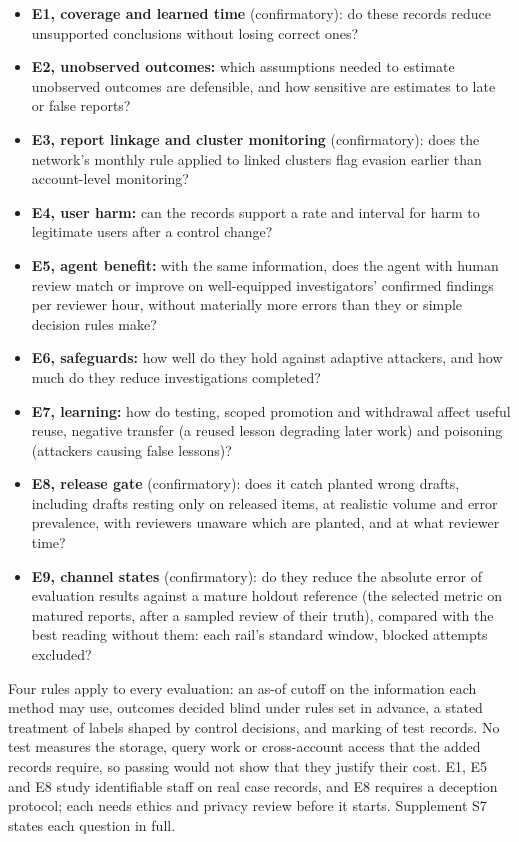 \documentclass[acmlarge,nonacm]{acmart}
\providecommand{\tightlist}{\setlength{\itemsep}{0pt}\setlength{\parskip}{0pt}}
\begin{document}
\begin{itemize}
\tightlist
\item
  \textbf{E1, coverage and learned time} (confirmatory): do these
  records reduce unsupported conclusions without losing correct ones?
\item
  \textbf{E2, unobserved outcomes:} which assumptions needed to estimate
  unobserved outcomes are defensible, and how sensitive are estimates to
  late or false reports?
\item
  \textbf{E3, report linkage and cluster monitoring} (confirmatory):
  does the network's monthly rule applied to linked clusters flag
  evasion earlier than account-level monitoring?
\item
  \textbf{E4, user harm:} can the records support a rate and interval
  for harm to legitimate users after a control change?
\item
  \textbf{E5, agent benefit:} with the same information, does the agent
  with human review match or improve on well-equipped investigators'
  confirmed findings per reviewer hour, without materially more errors
  than they or simple decision rules make?
\item
  \textbf{E6, safeguards:} how well do they hold against adaptive
  attackers, and how much do they reduce investigations completed?
\item
  \textbf{E7, learning:} how do testing, scoped promotion and withdrawal
  affect useful reuse, negative transfer (a reused lesson degrading
  later work) and poisoning (attackers causing false lessons)?
\item
  \textbf{E8, release gate} (confirmatory): does it catch planted wrong
  drafts, including drafts resting only on released items, at realistic
  volume and error prevalence, with reviewers unaware which are planted,
  and at what reviewer time?
\item
  \textbf{E9, channel states} (confirmatory): do they reduce the
  absolute error of evaluation results against a mature holdout
  reference (the selected metric on matured reports, after a sampled
  review of their truth), compared with the best reading without them:
  each rail's standard window, blocked attempts excluded?
\end{itemize}

Four rules apply to every evaluation: an as-of cutoff on the information
each method may use, outcomes decided blind under rules set in advance,
a stated treatment of labels shaped by control decisions, and marking of
test records. No test measures the storage, query work or cross-account
access that the added records require, so passing would not show that
they justify their cost. E1, E5 and E8 study identifiable staff on real
case records, and E8 requires a deception protocol; each needs ethics
and privacy review before it starts. Supplement S7 states each question
in full.
\end{document}
